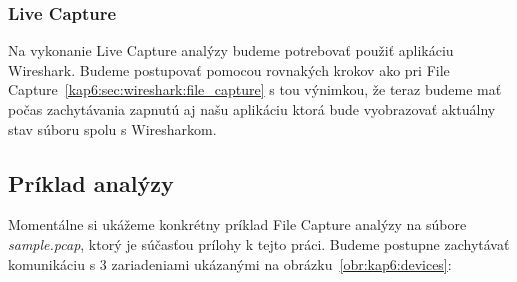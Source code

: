 \subsubsection{Live Capture}
Na vykonanie Live Capture analýzy budeme potrebovať použiť aplikáciu Wireshark. Budeme postupovať pomocou rovnakých krokov ako pri File Capture~\ref{kap6:sec:wireshark:file_capture} s tou výnimkou, že teraz budeme mať počas zachytávania zapnutú aj našu aplikáciu ktorá bude vyobrazovať aktuálny stav súboru spolu s Wiresharkom.



\subsection{Príklad analýzy}
Momentálne si ukážeme konkrétny príklad File Capture analýzy na súbore \textit{sample.pcap}, ktorý je súčasťou prílohy k tejto práci. Budeme postupne zachytávať komunikáciu s 3 zariadeniami ukázanými na obrázku~\ref{obr:kap6:devices}:

